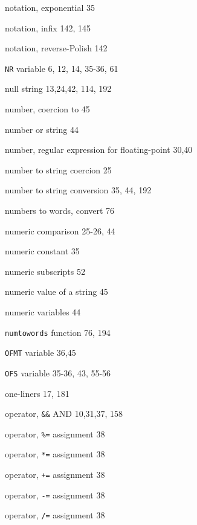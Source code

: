 \begin{multicols}{3}
\hangindent=3pc  notation, exponential 35

\hangindent=3pc  notation, infix 142, 145

\hangindent=3pc  notation, reverse-Polish 142

\hangindent=3pc  \verb'NR' variable 6, 12, 14, 35-36, 61

\hangindent=3pc  null string 13,24,42, 114, 192

\hangindent=3pc  number, coercion to 45

\hangindent=3pc  number or string 44

\hangindent=3pc  number, regular expression for floating-point 30,40

\hangindent=3pc  number to string coercion 25

\hangindent=3pc  number to string conversion 35,  44, 192

\hangindent=3pc  numbers to words, convert 76

\hangindent=3pc  numeric comparison 25-26, 44

\hangindent=3pc  numeric constant 35

\hangindent=3pc  numeric subscripts 52

\hangindent=3pc  numeric value of a string 45

\hangindent=3pc  numeric variables 44

\hangindent=3pc  \verb'numtowords' function 76, 194

\hangindent=3pc  \verb'OFMT' variable 36,45

\hangindent=3pc  \verb'OFS' variable 35-36, 43, 55-56

\hangindent=3pc  one-liners 17, 181

\hangindent=3pc  operator, \verb'&&' AND 10,31,37, 158

\hangindent=3pc  operator, \verb'%=' assignment 38

\hangindent=3pc  operator, \verb'*=' assignment 38

\hangindent=3pc  operator, \verb'+=' assignment 38

\hangindent=3pc  operator, \verb'-=' assignment 38

\hangindent=3pc  operator, \verb'/=' assignment 38


\end{multicols}

